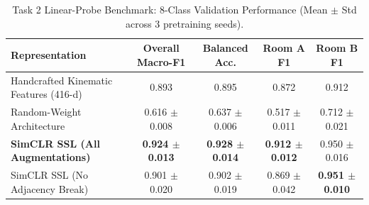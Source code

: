 \documentclass[10pt,a4paper]{article}
\begin{document}
\begin{table}[htbp]
\centering
\footnotesize
\setlength{\tabcolsep}{4pt}
\caption{Task 2 Linear-Probe Benchmark: 8-Class Validation Performance (Mean $\pm$ Std across 3 pretraining seeds).}
\label{tab:task2_results}
\begin{tabular}{lcccc}
\toprule
\textbf{Representation} & \textbf{Overall Macro-F1} & \textbf{Balanced Acc.} & \textbf{Room A F1} & \textbf{Room B F1} \\
\midrule
Handcrafted Kinematic Features (416-d) & 0.893 & 0.895 & 0.872 & 0.912 \\
Random-Weight Architecture & 0.616 $\pm$ 0.008 & 0.637 $\pm$ 0.006 & 0.517 $\pm$ 0.011 & 0.712 $\pm$ 0.021 \\
\textbf{SimCLR SSL (All Augmentations)} & \textbf{0.924 $\pm$ 0.013} & \textbf{0.928 $\pm$ 0.014} & \textbf{0.912 $\pm$ 0.012} & 0.950 $\pm$ 0.016 \\
SimCLR SSL (No Adjacency Break) & 0.901 $\pm$ 0.020 & 0.902 $\pm$ 0.019 & 0.869 $\pm$ 0.042 & \textbf{0.951 $\pm$ 0.010} \\
\bottomrule
\end{tabular}
\end{table}
\end{document}
